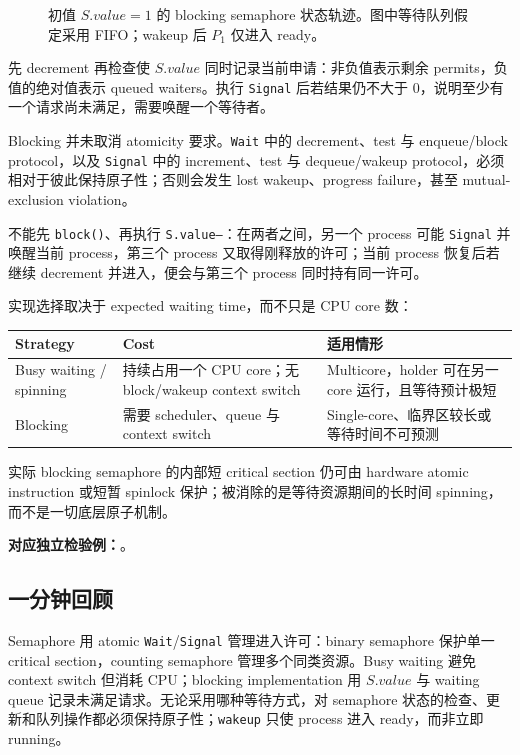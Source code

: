 \begin{figure}[htbp]
  \centering
  \resizebox{0.98\textwidth}{!}{}
  \caption{初值 $S.value=1$ 的 blocking semaphore 状态轨迹。图中等待队列假定采用 FIFO；wakeup 后 $P_1$ 仅进入 ready。}
  \label{fig:sc2005-l09-blocking-semaphore}
\end{figure}

先 decrement 再检查使 $S.value$ 同时记录当前申请：非负值表示剩余 permits，负值的绝对值表示 queued waiters。执行 \texttt{Signal} 后若结果仍不大于 $0$，说明至少有一个请求尚未满足，需要唤醒一个等待者。


Blocking 并未取消 atomicity 要求。\texttt{Wait} 中的 decrement、test 与 enqueue/block protocol，以及 \texttt{Signal} 中的 increment、test 与 dequeue/wakeup protocol，必须相对于彼此保持原子性；否则会发生 lost wakeup、progress failure，甚至 mutual-exclusion violation。

不能先 \texttt{block()}、再执行 \texttt{S.value--}：在两者之间，另一个 process 可能 \texttt{Signal} 并唤醒当前 process，第三个 process 又取得刚释放的许可；当前 process 恢复后若继续 decrement 并进入，便会与第三个 process 同时持有同一许可。

实现选择取决于 expected waiting time，而不只是 CPU core 数：
\begin{center}
\small
\begin{tabularx}{0.96\textwidth}{@{}>{\raggedright\arraybackslash}p{2.55cm}XX@{}}
  \toprule
  Strategy & Cost & 适用情形 \\
  \midrule
  Busy waiting / spinning & 持续占用一个 CPU core；无 block/wakeup context switch & Multicore，holder 可在另一 core 运行，且等待预计极短 \\
  Blocking & 需要 scheduler、queue 与 context switch & Single-core、临界区较长或等待时间不可预测 \\
  \bottomrule
\end{tabularx}
\end{center}

实际 blocking semaphore 的内部短 critical section 仍可由 hardware atomic instruction 或短暂 spinlock 保护；被消除的是等待资源期间的长时间 spinning，而不是一切底层原子机制。

\textbf{对应独立检验例：}。

\subsection{一分钟回顾}

Semaphore 用 atomic \texttt{Wait}/\texttt{Signal} 管理进入许可：binary semaphore 保护单一 critical section，counting semaphore 管理多个同类资源。Busy waiting 避免 context switch 但消耗 CPU；blocking implementation 用 $S.value$ 与 waiting queue 记录未满足请求。无论采用哪种等待方式，对 semaphore 状态的检查、更新和队列操作都必须保持原子性；\texttt{wakeup} 只使 process 进入 ready，而非立即 running。

